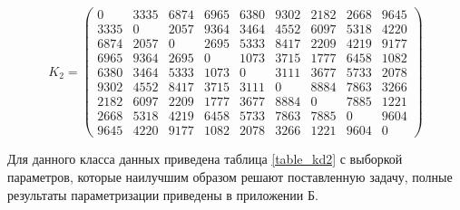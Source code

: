 \begin{equation}
	K_{2} = \begin{pmatrix}
		0 & 3335 & 6874 & 6965 & 6380 & 9302 & 2182 & 2668 & 9645\\
		3335 & 0 & 2057 & 9364 & 3464 & 4552 & 6097 & 5318 & 4220\\
		6874 & 2057 & 0 & 2695 & 5333 & 8417 & 2209 & 4219 & 9177\\ 
		6965 & 9364 & 2695 & 0 & 1073 & 3715 & 1777 & 6458 & 1082\\
		6380 & 3464 & 5333 & 1073 & 0 & 3111 & 3677 & 5733 & 2078\\
		9302 & 4552 & 8417 & 3715 & 3111 & 0 & 8884 & 7863 & 3266\\
		2182 & 6097 & 2209 & 1777 & 3677 & 8884 & 0 & 7885 & 1221\\ 
		2668 & 5318 & 4219 & 6458 & 5733 & 7863 & 7885 & 0 & 9604\\ 
		9645 & 4220 & 9177 & 1082 & 2078 & 3266 & 1221 & 9604 & 0
	\end{pmatrix}
\end{equation}


Для данного класса данных приведена таблица \ref{table_kd2}	с выборкой параметров, которые наилучшим образом решают поставленную задачу, полные результаты параметризации приведены в приложении Б.

